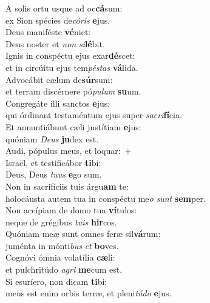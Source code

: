 \evenverse A solis ortu usque ad oc\textbf{cá}sum:~\*\\
\evenverse ex Sion spécies de\textit{có}\textit{ris} \textbf{e}jus.\\
\oddverse Deus maniféste \textbf{vé}niet:~\*\\
\oddverse Deus noster et \textit{non} \textit{si}\textbf{lé}bit.\\
\evenverse Ignis in conspéctu ejus exar\textbf{dé}scet:~\*\\
\evenverse et in circúitu ejus tem\textit{pé}\textit{stas} \textbf{vá}lida.\\
\oddverse Advocábit cælum de\textbf{súr}sum:~\*\\
\oddverse et terram discérnere pó\textit{pu}\textit{lum} \textbf{su}um.\\
\evenverse Congregáte illi sanctos \textbf{e}jus:~\*\\
\evenverse qui órdinant testaméntum ejus super \textit{sa}\textit{cri}\textbf{fí}cia.\\
\oddverse Et annuntiábunt cæli justítiam \textbf{e}jus:~\*\\
\oddverse quóniam \textit{De}\textit{us} \textbf{ju}dex est.\\
\evenverse Audi, pópulus meus, et loquar:~+\\
\evenverse  Israël, et testificábor \textbf{ti}bi:~\*\\
\evenverse Deus, Deus \textit{tu}\textit{us} \textbf{e}go sum.\\
\oddverse Non in sacrifíciis tuis árgu\textbf{am} te:~\*\\
\oddverse holocáusta autem tua in conspéctu me\textit{o} \textit{sunt} \textbf{sem}per.\\
\evenverse Non accípiam de domo tua \textbf{ví}tulos:~\*\\
\evenverse neque de grégibus \textit{tu}\textit{is} \textbf{hir}cos.\\
\oddverse Quóniam meæ sunt omnes feræ sil\textbf{vá}rum:~\*\\
\oddverse juménta in mónti\textit{bus} \textit{et} \textbf{bo}ves.\\
\evenverse Cognóvi ómnia volatília \textbf{cæ}li:~\*\\
\evenverse et pulchritúdo \textit{a}\textit{gri} \textbf{me}cum est.\\
\oddverse Si esuríero, non dicam \textbf{ti}bi:~\*\\
\oddverse meus est enim orbis terræ, et pleni\textit{tú}\textit{do} \textbf{e}jus.\\
